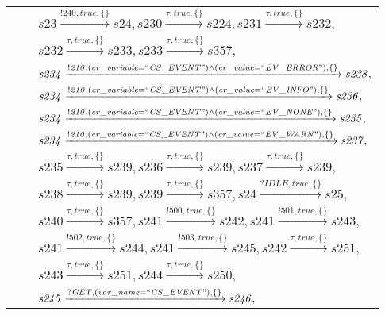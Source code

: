 \begin{tabular}{lcl}
& & $\mathit{s23}\xrightarrow{\mathit{!240}, \mathit{true}, \{\}}\mathit{s24},\mathit{s230}\xrightarrow{\mathit{\tau}, \mathit{true}, \{\}}\mathit{s224},\mathit{s231}\xrightarrow{\mathit{\tau}, \mathit{true}, \{\}}\mathit{s232},$ \\
& & $\mathit{s232}\xrightarrow{\mathit{\tau}, \mathit{true}, \{\}}\mathit{s233},\mathit{s233}\xrightarrow{\mathit{\tau}, \mathit{true}, \{\}}\mathit{s357},$ \\
& & $\mathit{s234}\xrightarrow{\mathit{!210}, \mathit{(cr\_variable = ``CS\_EVENT") \land (cr\_value = ``EV\_ERROR")}, \{\}}\mathit{s238},$ \\
& & $\mathit{s234}\xrightarrow{\mathit{!210}, \mathit{(cr\_variable = ``CS\_EVENT") \land (cr\_value = ``EV\_INFO")}, \{\}}\mathit{s236},$ \\
& & $\mathit{s234}\xrightarrow{\mathit{!210}, \mathit{(cr\_variable = ``CS\_EVENT") \land (cr\_value = ``EV\_NONE")}, \{\}}\mathit{s235},$ \\
& & $\mathit{s234}\xrightarrow{\mathit{!210}, \mathit{(cr\_variable = ``CS\_EVENT") \land (cr\_value = ``EV\_WARN")}, \{\}}\mathit{s237},$ \\
& & $\mathit{s235}\xrightarrow{\mathit{\tau}, \mathit{true}, \{\}}\mathit{s239},\mathit{s236}\xrightarrow{\mathit{\tau}, \mathit{true}, \{\}}\mathit{s239},\mathit{s237}\xrightarrow{\mathit{\tau}, \mathit{true}, \{\}}\mathit{s239},$ \\
& & $\mathit{s238}\xrightarrow{\mathit{\tau}, \mathit{true}, \{\}}\mathit{s239},\mathit{s239}\xrightarrow{\mathit{\tau}, \mathit{true}, \{\}}\mathit{s357},\mathit{s24}\xrightarrow{\mathit{?IDLE}, \mathit{true}, \{\}}\mathit{s25},$ \\
& & $\mathit{s240}\xrightarrow{\mathit{\tau}, \mathit{true}, \{\}}\mathit{s357},\mathit{s241}\xrightarrow{\mathit{!500}, \mathit{true}, \{\}}\mathit{s242},\mathit{s241}\xrightarrow{\mathit{!501}, \mathit{true}, \{\}}\mathit{s243},$ \\
& & $\mathit{s241}\xrightarrow{\mathit{!502}, \mathit{true}, \{\}}\mathit{s244},\mathit{s241}\xrightarrow{\mathit{!503}, \mathit{true}, \{\}}\mathit{s245},\mathit{s242}\xrightarrow{\mathit{\tau}, \mathit{true}, \{\}}\mathit{s251},$ \\
& & $\mathit{s243}\xrightarrow{\mathit{\tau}, \mathit{true}, \{\}}\mathit{s251},\mathit{s244}\xrightarrow{\mathit{\tau}, \mathit{true}, \{\}}\mathit{s250},$ \\
& & $\mathit{s245}\xrightarrow{\mathit{?GET}, \mathit{(var\_name = ``CS\_EVENT")}, \{\}}\mathit{s246},$ \\

\end{tabular}
